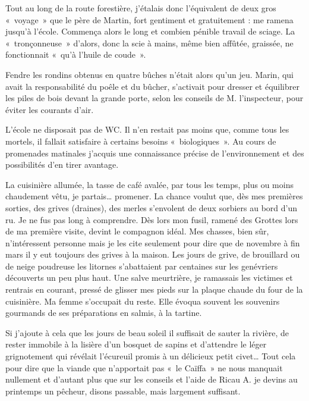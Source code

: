 Tout au long de la route forestière, j’étalais donc l’équivalent de deux gros «~voyage~»
que le père de Martin, fort gentiment et gratuitement : me ramena jusqu’à l’école.
Commença alors le long et combien pénible travail de sciage. La «~tronçonneuse~»
d’alors, donc la scie à mains, même bien affûtée, graissée, ne fonctionnait «~qu’à
l’huile de coude~».

Fendre les rondins obtenus en quatre bûches n’était alors qu’un jeu. Marin, qui avait
la responsabilité du poêle et du bûcher, s’activait pour dresser et équilibrer les piles
de bois devant la grande porte, selon les conseils de M. l’inspecteur, pour éviter les
courants d’air.


L’école ne disposait pas de WC. Il n’en restait pas moins que, comme tous les
mortels, il fallait satisfaire à certains besoins «~biologiques~». Au cours de
promenades matinales j’acquis une connaissance précise de l’environnement et des
possibilités d’en tirer avantage.

La cuisinière allumée, la tasse de café avalée, par tous les temps, plus ou moins
chaudement vêtu, je partais… promener. La chance voulut que, dès mes premières
sorties, des grives (draines), des merles s’envolent de deux sorbiers au bord d’un ru.
Je ne fus pas long à comprendre. Dès lors mon fusil, ramené des Grottes lors de ma
première visite, devint le compagnon idéal. Mes chasses, bien sûr, n’intéressent
personne mais je les cite seulement pour dire que de novembre à fin mars il y eut
toujours des grives à la maison. Les jours de grive, de brouillard ou de neige
poudreuse les litornes s’abattaient par centaines sur les genévriers découverts un peu
plus haut. Une salve meurtrière, je ramassais les victimes et rentrais en courant,
pressé de glisser mes pieds sur la plaque chaude du four de la cuisinière. Ma femme
s’occupait du reste. Elle évoqua souvent les souvenirs gourmands de ses préparations
en salmis, à la tartine.

Si j’ajoute à cela que les jours de beau soleil il suffisait de sauter la rivière, de rester
immobile à la lisière d’un bosquet de sapins et d’attendre le léger grignotement qui
révélait l’écureuil promis à un délicieux petit civet… Tout cela pour dire que la
viande que n’apportait pas «~le Caïffa~» ne nous manquait nullement et d’autant plus
que sur les conseils et l’aide de Ricau A. je devins au printemps un pêcheur, disons
passable, mais largement suffisant.

